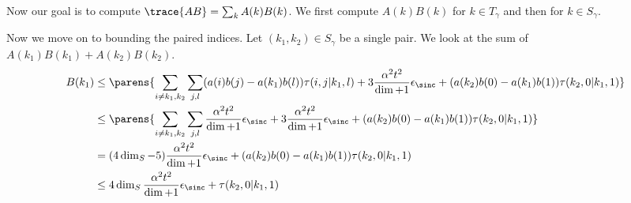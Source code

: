     Now our goal is to compute $\trace{A B} = \sum_{k} A(k) B(k)$. We first compute $A(k) B(k)$ for $k \in T_{\gamma}$ and then for $k \in S_{\gamma}$. 
    
    
    
    Now we move on to bounding the paired indices. Let $(k_1, k_2) \in S_{\gamma}$ be a single pair. We look at the sum of $A(k_1) B(k_1) + A(k_2) B(k_2)$. 
    \begin{align}
        B(k_1) &\leq  \parens{\sum_{i \neq k_1, k_2} \sum_{j,l} (a(i) b(j) - a(k_1) b(l)) \tau(i,j|k_1, l) + 3 \frac{\alpha^2 t^2}{\dim + 1} \epsilon_{\sinc} + (a(k_2) b(0) - a(k_1) b(1)) \tau(k_2, 0 | k_1, 1)} \\
        &\leq \parens{\sum_{i \neq k_1, k_2} \sum_{j,l} \frac{\alpha^2 t^2}{\dim + 1}\epsilon_{\sinc} + 3 \frac{\alpha^2 t^2}{\dim + 1}\epsilon_{\sinc} + (a(k_2) b(0) - a(k_1) b(1)) \tau(k_2, 0 | k_1, 1)} \\
        &= (4 \dim_S - 5) \frac{\alpha^2 t^2}{\dim + 1} \epsilon_{\sinc} + (a(k_2) b(0) - a(k_1) b(1)) \tau(k_2, 0 | k_1, 1) \\
        &\leq 4 \dim_S \frac{\alpha^2 t^2}{\dim + 1} \epsilon_{\sinc} + \tau(k_2, 0| k_1, 1)
    \end{align}
    
    
    
